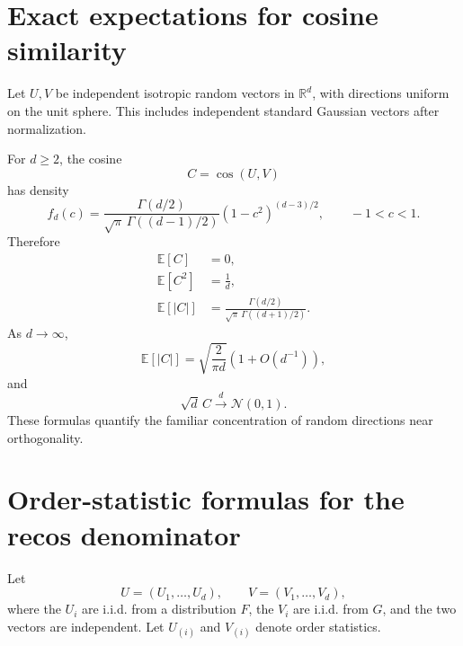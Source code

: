\documentclass[11pt,a4paper]{article}
\newcommand{\R}{\mathbb{R}}
\newcommand{\E}{\mathbb{E}}
\newcommand{\cosim}{\operatorname{cos}}
\begin{document}
\section{Exact expectations for cosine similarity}

Let $U,V$ be independent isotropic random vectors in $\R^d$, with directions uniform on the unit sphere. This includes independent standard Gaussian vectors after normalization.

For $d\geq2$, the cosine
\begin{equation}
    C=\cosim(U,V)
\end{equation}
has density
\begin{equation}
    f_d(c)
    =
    \frac{\Gamma(d/2)}{\sqrt{\pi}\,\Gamma((d-1)/2)}
    (1-c^2)^{(d-3)/2},
    \qquad -1<c<1.
\end{equation}
Therefore
\begin{align}
    \E[C]&=0,\\
    \E[C^2]&=\frac{1}{d},\\
    \E[|C|]
    &=
    \frac{\Gamma(d/2)}{\sqrt{\pi}\,\Gamma((d+1)/2)}.
\end{align}
As $d\to\infty$,
\begin{equation}
    \E[|C|]
    =\sqrt{\frac{2}{\pi d}}\left(1+O(d^{-1})\right),
\end{equation}
and
\begin{equation}
    \sqrt{d}\,C\xrightarrow{d}\mathcal{N}(0,1).
\end{equation}
These formulas quantify the familiar concentration of random directions near orthogonality.

\section{Order-statistic formulas for the recos denominator}

Let
\begin{equation}
    U=(U_1,\ldots,U_d),
    \qquad
    V=(V_1,\ldots,V_d),
\end{equation}
where the $U_i$ are i.i.d. from a distribution $F$, the $V_i$ are i.i.d. from $G$, and the two vectors are independent. Let $U_{(i)}$ and $V_{(i)}$ denote order statistics.
\end{document}

